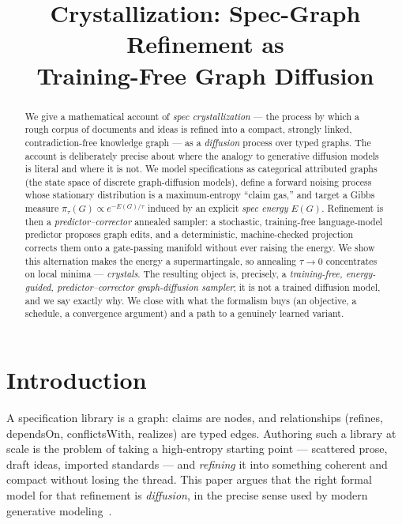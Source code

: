 \documentclass[11pt,letterpaper]{article}
\title{Crystallization: Spec-Graph Refinement as\\ Training-Free Graph Diffusion}
\author{}
\date{}
\theoremstyle{plain}
\theoremstyle{definition}
\begin{document}
\maketitle

\begin{abstract}
We give a mathematical account of \emph{spec crystallization} --- the process by
which a rough corpus of documents and ideas is refined into a compact, strongly
linked, contradiction-free knowledge graph --- as a \emph{diffusion} process over
typed graphs. The account is deliberately precise about where the analogy to
generative diffusion models is literal and where it is not. We model specifications
as categorical attributed graphs (the state space of discrete graph-diffusion
models), define a forward noising process whose stationary distribution is a
maximum-entropy ``claim gas,'' and target a Gibbs measure
$\pi_\tau(G)\propto e^{-E(G)/\tau}$ induced by an explicit \emph{spec energy}
$E(G)$. Refinement is then a \emph{predictor--corrector} annealed sampler: a
stochastic, training-free language-model predictor proposes graph edits, and a
deterministic, machine-checked projection corrects them onto a gate-passing
manifold without ever raising the energy. We show this alternation makes the
energy a supermartingale, so annealing $\tau\to 0$ concentrates on local minima
--- \emph{crystals}. The resulting object is, precisely, a \emph{training-free,
energy-guided, predictor--corrector graph-diffusion sampler}; it is not a trained
diffusion model, and we say exactly why. We close with what the formalism buys
(an objective, a schedule, a convergence argument) and a path to a genuinely
learned variant.
\end{abstract}

\section{Introduction}
\label{sec:intro}

A specification library is a graph: claims are nodes, and relationships
(\textsf{refines}, \textsf{dependsOn}, \textsf{conflictsWith}, \textsf{realizes})
are typed edges. Authoring such a library at scale is the problem of taking a
high-entropy starting point --- scattered prose, draft ideas, imported standards
--- and \emph{refining} it into something coherent and compact without losing the
thread. This paper argues that the right formal model for that refinement is
\emph{diffusion}, in the precise sense used by modern generative
modeling~\cite{ho2020ddpm,song2021sde,austin2021d3pm,vignac2022digress}.
\end{document}

